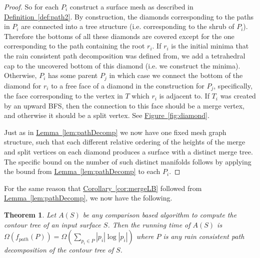 \documentclass[11pt]{article}
\newtheorem{theorem}{Theorem}
\theoremstyle{definition}
\newcommand{\Fig}[1]{\hyperref[fig:#1]{Figure~\ref*{fig:#1}}} %
\newcommand{\Lem}[1]{\hyperref[lem:#1]{Lemma~\ref*{lem:#1}}} %
\newcommand{\Cor}[1]{\hyperref[cor:#1]{Corollary~\ref*{cor:#1}}} %
\newcommand{\Def}[1]{\hyperref[def:#1]{Definition~\ref*{def:#1}}} %
\begin{document}
\begin{proof}
 So for each $P_i$ construct a surface mesh as described in \Def{path2}.  By construction, the diamonds corresponding to the paths in $P_i$ are connected 
 into a tree structure (i.e. corresponding to the shrub of $P_i$).  Therefore the bottoms of all these diamonds are covered except for the one corresponding 
 to the path containing the root $r_i$.  If $r_i$ is the initial minima that the rain consistent path decomposition was defined from,  
 we add a tetrahedral cap to the uncovered bottom of this diamond (i.e. we construct the minima).  Otherwise, $P_i$ has some parent $P_j$ in which case 
 we connect the bottom of the diamond for $r_i$ to a free face of a diamond in the construction for $P_j$, specifically, the face corresponding to the 
 vertex in $T$ which $r_i$ is adjacent to. 
 If $T_i$ was created by an upward BFS, then the connection to this face should be a merge vertex, and otherwise it should be a split vertex.  
 See \Fig{diamond}.
 
 Just as in \Lem{pathDecomp} we now have one fixed mesh graph structure, such that each different relative ordering of the heights of the merge and split vertices 
 on each diamond produces a surface with a distinct merge tree.  The specific bound on the number of such distinct manifolds follows by applying the 
 bound from \Lem{pathDecomp} to each $P_i$.
\end{proof}

For the same reason that \Cor{mergeLB} followed from \Lem{pathDecomp}, we now have the following. 

\begin{theorem}
 Let $A(S)$ be any comparison based algorithm to compute the contour tree of an input surface $S$.  
 Then the running time of $A(S)$ is $\Omega(f_{path}(P))=\Omega(\sum_{p_i\in P} |p_i|\log|p_i|)$ where $P$ 
 is any rain consistent path decomposition of the contour tree of $S$.
\end{theorem}
\end{document}
